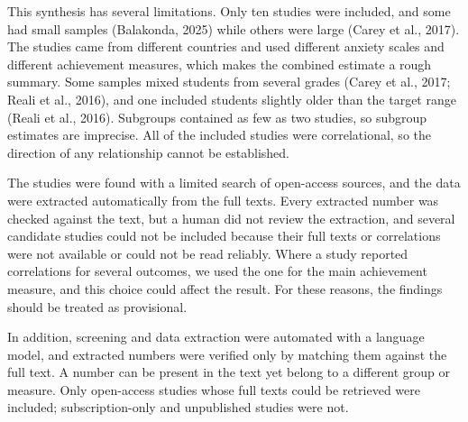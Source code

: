 \documentclass[man,a4paper,12pt,floatsintext,nolmodern,notab]{apa7}
\begin{document}
This synthesis has several limitations. Only ten studies were included, and some had small samples (Balakonda, 2025) while others were large (Carey et al., 2017). The studies came from different countries and used different anxiety scales and different achievement measures, which makes the combined estimate a rough summary. Some samples mixed students from several grades (Carey et al., 2017; Reali et al., 2016), and one included students slightly older than the target range (Reali et al., 2016). Subgroups contained as few as two studies, so subgroup estimates are imprecise. All of the included studies were correlational, so the direction of any relationship cannot be established.

The studies were found with a limited search of open-access sources, and the data were extracted automatically from the full texts. Every extracted number was checked against the text, but a human did not review the extraction, and several candidate studies could not be included because their full texts or correlations were not available or could not be read reliably. Where a study reported correlations for several outcomes, we used the one for the main achievement measure, and this choice could affect the result. For these reasons, the findings should be treated as provisional.

In addition, screening and data extraction were automated with a language model, and extracted numbers were verified only by matching them against the full text. A number can be present in the text yet belong to a different group or measure. Only open-access studies whose full texts could be retrieved were included; subscription-only and unpublished studies were not.
\end{document}
